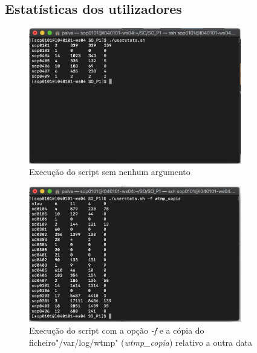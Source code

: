 \documentclass[10pt,portuguese]{article}
\begin{document}
\subsection{Estatísticas dos utilizadores}
\begin{figure}[!h]
    \centering
    \includegraphics[width=350]{Resultados/normal.png}
    \caption{Execução do script sem nenhum argumento}
\end{figure}

\begin{figure}[!h]
    \centering
    \includegraphics[width=350]{Resultados/-f.png}
    \caption{Execução do script com a opção \textit{-f} e a cópia do ficheiro"/var/log/wtmp" (\textit{wtmp\_copia}) relativo a outra data }
\end{figure}
\end{document}
